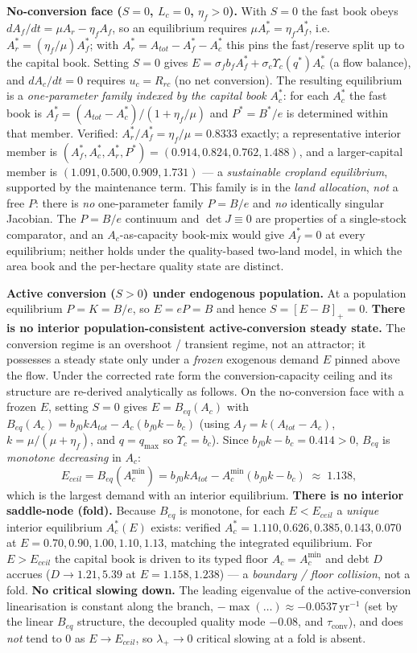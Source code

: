 \documentclass[11pt]{article}
\begin{document}
\noindent\textbf{No-conversion face ($S=0$, $L_c=0$, $\eta_f>0$).} With $S=0$ the fast book obeys $dA_f/dt=\mu A_r-\eta_f A_f$, so an equilibrium requires $\mu A_r^*=\eta_f A_f^*$, i.e.\ $A_r^*=(\eta_f/\mu)A_f^*$; with $A_r^*=A_{tot}-A_f^*-A_c^*$ this pins the fast/reserve split up to the capital book. Setting $S=0$ gives $E=\sigma_f b_f A_f^*+\sigma_c\Upsilon_c(q^*)A_c^*$ (a flow balance), and $dA_c/dt=0$ requires $u_c=R_{rc}$ (no net conversion). The resulting equilibrium is a \emph{one-parameter family indexed by the capital book} $A_c^*$: for each $A_c^*$ the fast book is $A_f^*=(A_{tot}-A_c^*)/(1+\eta_f/\mu)$ and $P^*=B^*/e$ is determined within that member. Verified: $A_r^*/A_f^*=\eta_f/\mu=0.8333$ exactly; a representative interior member is $(A_f^*,A_c^*,A_r^*,P^*)=(0.914,0.824,0.762,1.488)$, and a larger-capital member is $(1.091,0.500,0.909,1.731)$ --- a \emph{sustainable cropland equilibrium}, supported by the maintenance term. This family is in the \emph{land allocation}, \emph{not} a free $P$: there is \emph{no} one-parameter family $P=B/e$ and \emph{no} identically singular Jacobian. The $P=B/e$ continuum and $\det J\equiv0$ are properties of a single-stock comparator, and an $A_c$-as-capacity book-mix would give $A_f^*=0$ at every equilibrium; neither holds under the quality-based two-land model, in which the area book and the per-hectare quality state are distinct.

\noindent\textbf{Active conversion ($S>0$) under endogenous population.} At a population equilibrium $P=K=B/e$, so $E=eP=B$ and hence $S=[E-B]_+=0$. \textbf{There is no interior population-consistent active-conversion steady state.} The conversion regime is an overshoot / transient regime, not an attractor; it possesses a steady state only under a \emph{frozen} exogenous demand $E$ pinned above the flow. Under the corrected rate form the conversion-capacity ceiling and its structure are re-derived analytically as follows. On the no-conversion face with a frozen $E$, setting $S=0$ gives $E=B_{eq}(A_c)$ with $B_{eq}(A_c)=b_{f0}kA_{tot}-A_c(b_{f0}k-b_c)$ (using $A_f=k(A_{tot}-A_c)$, $k=\mu/(\mu+\eta_f)$, and $q=q_{\max}$ so $\Upsilon_c=b_c$). Since $b_{f0}k-b_c=0.414>0$, $B_{eq}$ is \emph{monotone decreasing} in $A_c$:
\[
E_{ceil}=B_{eq}(A_c^{\min})=b_{f0}kA_{tot}-A_c^{\min}(b_{f0}k-b_c)\;\approx\;1.138,
\]
which is the largest demand with an interior equilibrium. \textbf{There is no interior saddle-node (fold).} Because $B_{eq}$ is monotone, for each $E<E_{ceil}$ a \emph{unique} interior equilibrium $A_c^*(E)$ exists: verified $A_c^*=1.110,0.626,0.385,0.143,0.070$ at $E=0.70,0.90,1.00,1.10,1.13$, matching the integrated equilibrium. For $E>E_{ceil}$ the capital book is driven to its typed floor $A_c=A_c^{\min}$ and debt $D$ accrues ($D\to1.21,5.39$ at $E=1.158,1.238$) --- a \emph{boundary / floor collision}, not a fold. \textbf{No critical slowing down.} The leading eigenvalue of the active-conversion linearisation is constant along the branch, $-\max(\ldots)\approx-0.0537\,\text{yr}^{-1}$ (set by the linear $B_{eq}$ structure, the decoupled quality mode $-0.08$, and $\tau_{\mathrm{conv}}$), and does \emph{not} tend to $0$ as $E\to E_{ceil}$, so $\lambda_+\to0$ critical slowing at a fold is absent.
\end{document}
